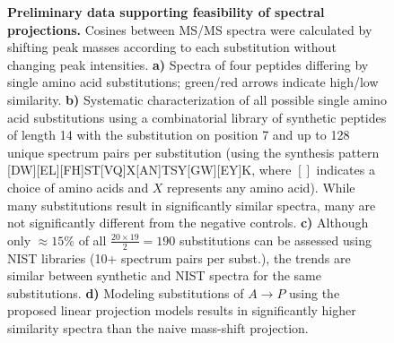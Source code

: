 \documentclass[arial,11pt]{article}
\begin{document}
\begin{figure}[!tb]
\small
\centering
\caption{\footnotesize{\bf Preliminary data supporting feasibility of spectral projections.} Cosines between MS/MS spectra were calculated by shifting peak masses according to each substitution without changing peak intensities.
{\bf a)} Spectra of four peptides differing by single amino acid substitutions; green/red arrows indicate high/low similarity. {\bf b)} Systematic characterization of all possible single amino acid substitutions using a combinatorial library of synthetic peptides of length 14 with the substitution on position 7 and up to 128 unique spectrum pairs per substitution (using the synthesis pattern [DW][EL][FH]ST[VQ]X[AN]TSY[GW][EY]K, where $[]$ indicates a choice of amino acids and $X$ represents any amino acid). While many substitutions result in significantly similar spectra, many are not significantly different from the negative controls.  {\bf c)} Although only $\approx15\%$ of all $\frac{20\times 19}{2}=190$ substitutions can be assessed using NIST libraries (10+ spectrum pairs per subst.), the trends are similar between synthetic and NIST spectra for the same substitutions. {\bf d)} Modeling substitutions of $A\rightarrow P$ using the proposed linear projection models results in significantly higher similarity spectra than the naive mass-shift projection.}
\label{trd.snets.fig.projections}
\end{figure}
\end{document}
